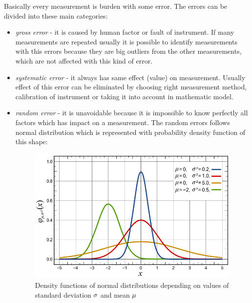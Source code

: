 \documentclass[a4paper,12pt]{article}
\newcommand{\escal}[1]{
{\it #1}
}
\newcommand{\term}[1]{
{\it #1}
}
\begin{document}
Basically every measurement is burden with some error. The errors can be divided into these main categories:  
\begin{itemize}
\item \term{gross error} - it is caused by human factor or fault of instrument. If many measurements are repeated
usually it is possible to identify measurements with this errors because they are big outliers from the other measurements, which are not affected with this 
kind of error.
\item \term{systematic error} - it always has same effect (value) on measurement.  Usually effect of this error can be 
eliminated by choosing right measurement method, calibration of instrument or taking it into account in  mathematic model.
\item \term{random error} - it is unavoidable because it is impossible to know perfectly all factors which has impact 
on a measurement. The random errors follows normal distribution which is represented with probability density function of this shape:


\begin{figure}[h]
    \centering
   \includegraphics[scale=0.4]{figures/normal_dist.png}
    \caption{Density functions of normal distributions depending on values of standard deviation 
$\escal{\sigma}$ and mean $\escal{\mu}$ \cite{inductiveload2008selection}}
    \label{fig:sample_figure}
\end{figure}




\end{itemize}
\end{document}
